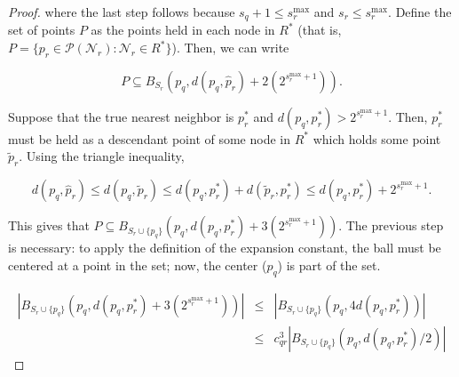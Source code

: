 \begin{proof}
\noindent where the last step follows because $s_q + 1 \le s_r^{\max}$ and $s_r
\le s_r^{\max}$.  Define the set of points $P$ as the points held in each node
in $R^*$ (that is, $P = \{ p_r \in \mathscr{P}(\mathscr{N}_r) : \mathscr{N}_r
\in R^* \}$).  Then, we can write

%

\begin{equation}
P \subseteq B_{S_r}(p_q, d(p_q, \hat{p}_r) + 2(2^{s_r^{\max} + 1})).
\end{equation}



Suppose that the true nearest neighbor is $p_r^*$ and $d(p_q, p_r^*) >
2^{s_r^{\max} + 1}$.  Then, $p_r^*$ must be held as a descendant point of some
node in $R^*$ which holds some point $\tilde{p}_r$.  Using the triangle
inequality,

\begin{equation}
d(p_q, \hat{p}_r) \le d(p_q, \tilde{p}_r)
 \le d(p_q, p_r^*) + d(\tilde{p}_r, p_r^*)
 \le d(p_q, p_r^*) + 2^{s_r^{\max} + 1}.
\end{equation}

This gives that
$P \subseteq B_{S_r \cup \{ p_q \}}(p_q, d(p_q, p_r^*) + 3(2^{s_r^{\max} +
1}))$.
The previous step is necessary: to apply the definition of the expansion
constant, the ball must be centered at a point in the set; now, the center
($p_q$) is part of the set.

\begin{eqnarray}
| B_{S_r \cup \{ p_q \}}(p_q, d(p_q, p_r^*) + 3(2^{s_r^{\max} + 1})) | &\le& |
B_{S_r \cup \{ p_q \}}(p_q, 4 d(p_q, p_r^*)) | \\
 &\le& c_{qr}^3 | B_{S_r \cup \{ p_q \}}(p_q, d(p_q, p_r^*) / 2) |
\end{eqnarray}


\end{proof}
